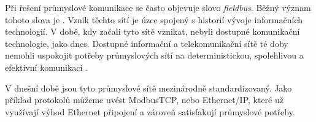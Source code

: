 Při řešení průmyslové komunikace se často objevuje slovo \textit{fieldbus}. Běžný význam tohoto slova je  \cite{fieldbus_thomesse}. Vznik těchto sítí je úzce spojený s historií vývoje informačních technologií. V době, kdy začali tyto sítě vznikat, nebyli dostupné komunikační technologie, jako dnes. Dostupné informační a telekomunikační sítě té doby nemohli uspokojit potřeby průmyslových sítí na deterministickou, spolehlivou a efektivní komunikaci \cite{future_of_ind_com}. 

V dnešní době jsou tyto průmyslové sítě mezinárodně standardizovaný. Jako příklad protokolů můžeme uvést ModbusTCP, nebo Ethernet/IP, které už využívají výhod Ethernet připojení a zároveň satisfakují průmyslové potřeby. 

